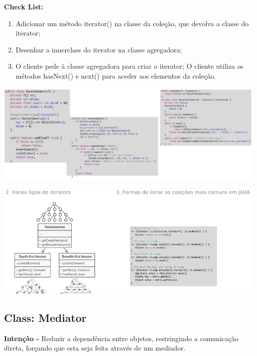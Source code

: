 \documentclass{article}
\begin{document}
\begin{flushleft}
    \textbf{Check List:}

    \begin{enumerate}
        \item Adicionar um método iterator() na classe da coleção, que devolva a classe do
        iterator;
        \item Desenhar a innerclass do iterator na classe agregadora;
        \item O cliente pede à classe agregadora para criar o iterator;
        O cliente utiliza os métodos hasNext() e next() para aceder aos elementos da
        coleção.
    \end{enumerate}
\end{flushleft}

\begin{center}
    \includegraphics[scale=0.35]{Images/64.png}
\end{center}

\begin{center}
    \includegraphics[scale=0.35]{Images/65.png}
\end{center}

\subsection{Class: Mediator}

\begin{flushleft}
    \textbf{Intenção -} Reduzir a dependência entre objetos, restringindo a comunicação direta, forçando
    que esta seja feita através de um mediador.
\end{flushleft}
\end{document}
